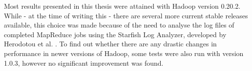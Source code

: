 \documentclass [12pt,a4paper]{report}
\begin{document}
Most results presented in this thesis were attained with Hadoop version 0.20.2. While - at the time of writing this - there are several more current stable releases available, this choice was made because of the need to analyse the log files of completed MapReduce jobs using the Starfish Log Analyzer, developed by Herodotou et al. \cite{herodotou2011starfish}. To find out whether there are any drastic changes in performance in newer versions of Hadoop, some tests were also run with version 1.0.3, however no significant improvement was found.





\end{document}
